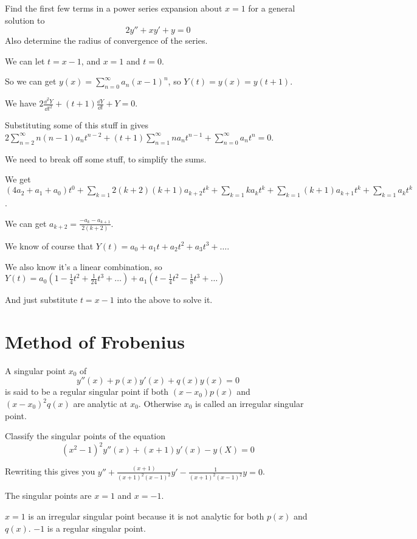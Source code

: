 \documentclass[../diffeq.tex]{subfiles}
\begin{document}
\begin{example}
    Find the first few terms in a power series expansion about $x=1$ for a general solution to 
    \[ 2y''+xy'+y=0 \]
    Also determine the radius of convergence of the series.

    We can let $t=x-1$, and $x=1$ and $t=0$.

    So we can get $y(x)=\sum_{n=0}^{\infty} a_n(x-1)^n$, so $Y(t)=y(x)=y(t+1)$.

    We have $2\frac{\dd^2 Y}{\dd t^2}+(t+1)\frac{\dd Y}{\dd t}+Y =0$.

    Substituting some of this stuff in gives $2\sum_{n=2}^{\infty}n(n-1)a_nt^{n-2}+(t+1)\sum_{n=1}^{\infty}na_nt^{n-1}+\sum_{n=0}^{\infty}a_nt^n=0$.

    We need to break off some stuff, to simplify the sums.

    We get $(4a_2+a_1+a_0)t^0+\sum_{k=1}2(k+2)(k+1)a_{k+2}t^k + \sum_{k=1}ka_kt^k + \sum_{k=1}(k+1)a_{k+1}t^k + \sum_{k=1}a_k t^k$.

    We can get $a_{k+2}=\frac{-a_k-a_{k+1}}{2(k+2)}$.

    We know of course that $Y(t)=a_0+a_1t+a_2t^2+a_3t^3+\dots$.

    We also know it's a linear combination, so $Y(t)=a_0(1-\frac{1}{4}t^2+\frac{1}{24}t^3+\dots)+a_1(t-\frac{1}{4}t^2-\frac{1}{8}t^3+\dots)$

    And just substitute $t=x-1$ into the above to solve it.
\end{example}

\section{Method of Frobenius}
\begin{definition}
    A singular point $x_0$ of 
    \[ y''(x)+p(x)y'(x)+q(x)y(x)=0\]
    is said to be a regular singular point if both $(x-x_0)p(x)$ and $(x-x_0)^2q(x)$ are analytic at $x_0$. Otherwise $x_0$ is called an irregular singular point.
\end{definition}

\begin{example}
    Classify the singular points of the equation 
    \[ (x^2-1)^2 y''(x)+(x+1)y'(x)-y(X)=0 \]

    Rewriting this gives you $y''+\frac{(x+1)}{(x+1)^2(x-1)^2}y'-\frac{1}{(x+1)^2(x-1)^2}y=0$.

    The singular points are $x=1$ and $x=-1$.

    $x=1$ is an irregular singular point because it is not analytic for both $p(x)$ and $q(x)$. $-1$ is a regular singular point.
\end{example}
\end{document}
